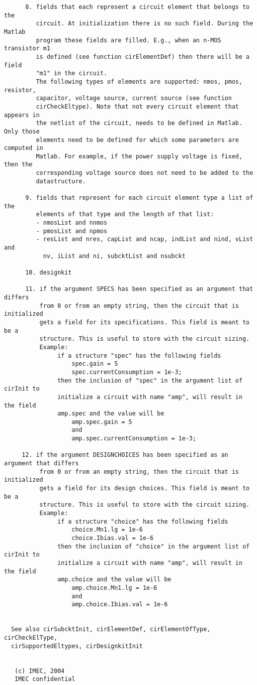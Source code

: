 \begin{verbatim}
      8. fields that each represent a circuit element that belongs to the
         circuit. At initialization there is no such field. During the Matlab
         program these fields are filled. E.g., when an n-MOS transistor m1
         is defined (see function cirElementDef) then there will be a field
         "m1" in the circuit.
         The following types of elements are supported: nmos, pmos, resistor,
         capacitor, voltage source, current source (see function
         cirCheckEltype). Note that not every circuit element that appears in
         the netlist of the circuit, needs to be defined in Matlab. Only those
         elements need to be defined for which some parameters are computed in
         Matlab. For example, if the power supply voltage is fixed, then the
         corresponding voltage source does not need to be added to the
         datastructure. 
     
      9. fields that represent for each circuit element type a list of the
         elements of that type and the length of that list:
         - nmosList and nnmos
         - pmosList and npmos
         - resList and nres, capList and ncap, indList and nind, vList and
           nv, iList and ni, subcktList and nsubckt
 
      10. designkit
 
      11. if the argument SPECS has been specified as an argument that differs
          from 0 or from an empty string, then the circuit that is initialized
          gets a field for its specifications. This field is meant to be a
          structure. This is useful to store with the circuit sizing.
          Example: 
               if a structure "spec" has the following fields
                   spec.gain = 5
                   spec.currentConsumption = 1e-3;
               then the inclusion of "spec" in the argument list of cirInit to
               initialize a circuit with name "amp", will result in the field 
               amp.spec and the value will be
                   amp.spec.gain = 5
                   and
                   amp.spec.currentConsumption = 1e-3;
 
     12. if the argument DESIGNCHOICES has been specified as an argument that differs
          from 0 or from an empty string, then the circuit that is initialized
          gets a field for its design choices. This field is meant to be a
          structure. This is useful to store with the circuit sizing.
          Example: 
               if a structure "choice" has the following fields
                   choice.Mn1.lg = 1e-6
                   choice.Ibias.val = 1e-6
               then the inclusion of "choice" in the argument list of cirInit to
               initialize a circuit with name "amp", will result in the field 
               amp.choice and the value will be
                   amp.choice.Mn1.lg = 1e-6
                   and
                   amp.choice.Ibias.val = 1e-6
              
 
  See also cirSubcktInit, cirElementDef, cirElementOfType, cirCheckElType,
  cirSupportedEltypes, cirDesignkitInit 
 
 
   (c) IMEC, 2004
   IMEC confidential 
 

\end{verbatim}

